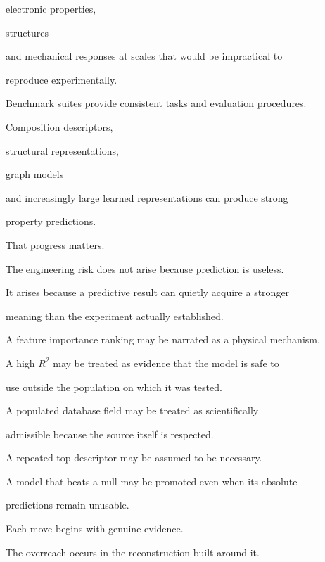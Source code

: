\documentclass[11pt,a4paper,oneside]{report}
\providecommand{\Rtwo}{\ensuremath{R^2}}
\begin{document}
electronic properties,

structures

and mechanical responses at scales that would be impractical to

reproduce experimentally.



Benchmark suites provide consistent tasks and evaluation procedures.



Composition descriptors,

structural representations,

graph models

and increasingly large learned representations can produce strong

property predictions.



That progress matters.



The engineering risk does not arise because prediction is useless.



It arises because a predictive result can quietly acquire a stronger

meaning than the experiment actually established.



A feature importance ranking may be narrated as a physical mechanism.



A high \Rtwo{} may be treated as evidence that the model is safe to

use outside the population on which it was tested.



A populated database field may be treated as scientifically

admissible because the source itself is respected.



A repeated top descriptor may be assumed to be necessary.



A model that beats a null may be promoted even when its absolute

predictions remain unusable.



Each move begins with genuine evidence.



The overreach occurs in the reconstruction built around it.
\end{document}
